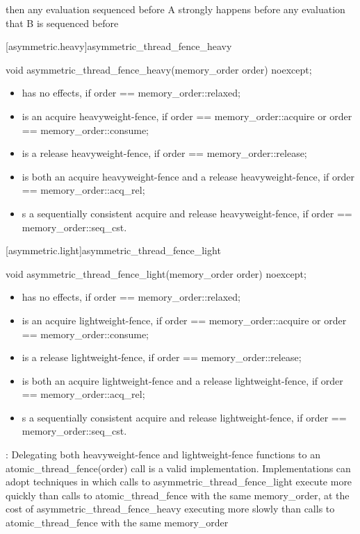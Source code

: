 then any evaluation sequenced before A strongly happens before any evaluation that B is
sequenced before


[asymmetric.heavy]{asymmetric_thread_fence_heavy}
\begin{itemdecl}
void asymmetric_thread_fence_heavy(memory_order order) noexcept;
\end{itemdecl}

\begin{itemdescr}


\pnum
\effects
\begin{itemize}
    \item  has no effects, if order == memory\_order::relaxed;
\item  is an acquire heavyweight-fence, if order == memory\_order::acquire or order ==
memory\_order::consume;
\item is a release heavyweight-fence, if order == memory\_order::release;
\item is both an acquire heavyweight-fence and a release heavyweight-fence, if order ==
memory\_order::acq\_rel;
\item s a sequentially consistent acquire and release heavyweight-fence, if order ==
memory\_order::seq\_cst.
\end{itemize}

\end{itemdescr}

[asymmetric.light]{asymmetric_thread_fence_light}
\begin{itemdecl}
void asymmetric_thread_fence_light(memory_order order) noexcept;
\end{itemdecl}

\begin{itemdescr}


\pnum
\effects
\begin{itemize}
    \item  has no effects, if order == memory\_order::relaxed;
\item  is an acquire lightweight-fence, if order == memory\_order::acquire or order ==
memory\_order::consume;
\item is a release lightweight-fence, if order == memory\_order::release;
\item is both an acquire lightweight-fence and a release lightweight-fence, if order ==
memory\_order::acq\_rel;
\item s a sequentially consistent acquire and release lightweight-fence, if order ==
memory\_order::seq\_cst.
\end{itemize}

\end{itemdescr}



\begin{note} : Delegating both heavyweight-fence and lightweight-fence functions to an
atomic_thread_fence(order) call is a valid implementation. Implementations can adopt
techniques in which calls to asymmetric_thread_fence_light execute more quickly than calls
to atomic_thread_fence with the same memory_order, at the cost of
asymmetric_thread_fence_heavy executing more slowly than calls to
atomic_thread_fence with the same memory_order
\end{note}  
